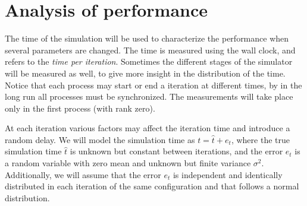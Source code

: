 \chapter{Analysis of performance}
\label{ch:analysis}


The time of the simulation will be used to characterize the performance when 
several parameters are changed. The time is measured using the wall clock, and 
refers to the \textit{time per iteration}. Sometimes the different stages of the 
simulator will be measured as well, to give more insight in the distribution of 
the time. Notice that each process may start or end a iteration at different 
times, by in the long run all processes must be synchronized. The measurements 
will take place only in the first process (with rank zero).

At each iteration various factors may affect the iteration time and introduce a 
random delay. We will model the simulation time as $t = \hat t + e_t$, where the 
true simulation time $\hat t$ is unknown but constant between iterations, and 
the error $e_t$ is a random variable with zero mean and unknown but finite 
variance $\sigma^2$.  Additionally, we will assume that the error $e_t$ is 
independent and identically distributed in each iteration of the same 
configuration and that follows a normal distribution.

